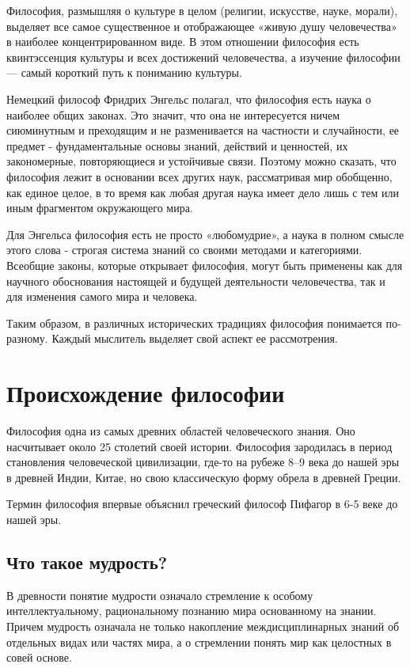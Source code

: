 \documentclass[a4paper, 14pt]{extreport}
\begin{document}
Философия, размышляя о культуре в целом (религии, искусстве, науке,
морали), выделяет все самое существенное и отображающее «живую душу
человечества» в наиболее концентрированном виде. В этом отношении
философия есть квинтэссенция культуры и всех достижений человечества, а
изучение философии --- самый короткий путь к пониманию культуры.

Немецкий философ Фридрих Энгельс полагал, что философия есть наука о
наиболее общих законах. Это значит, что она не интересуется ничем
сиюминутным и преходящим и не разменивается на частности и случайности,
ее предмет - фундаментальные основы знаний, действий и ценностей, их
закономерные, повторяющиеся и устойчивые связи. Поэтому можно сказать,
что философия лежит в основании всех других наук, рассматривая мир
обобщенно, как единое целое, в то время как любая другая наука имеет
дело лишь с тем или иным фрагментом окружающего мира.

Для Энгельса философия есть не просто «любомудрие», а наука в полном
смысле этого слова - строгая система знаний со своими методами и
категориями. Всеобщие законы, которые открывает философия, могут быть
применены как для научного обоснования настоящей и будущей деятельности
человечества, так и для изменения самого мира и человека.

Таким образом, в различных исторических традициях философия понимается
по-разному. Каждый мыслитель выделяет свой аспект ее рассмотрения.

\section{Происхождение философии}

Философия одна из самых древних областей человеческого знания. Оно
насчитывает около 25 столетий своей истории. Философия зародилась в
период становления человеческой цивилизации, где-то на рубеже 8--9 века
до нашей эры в древней Индии, Китае, но свою классическую форму обрела в
древней Греции.

Термин философия впервые объяснил греческий философ Пифагор в 6-5 веке до нашей эры.

\subsection{Что такое мудрость?}

В древности понятие мудрости означало стремление к особому
интеллектуальному, рациональному познанию мира основанному на знании.
Причем мудрость означала не только накопление междисциплинарных знаний
об отдельных видах или частях мира, а о стремлении понять мир как
целостных в совей основе.
\end{document}
